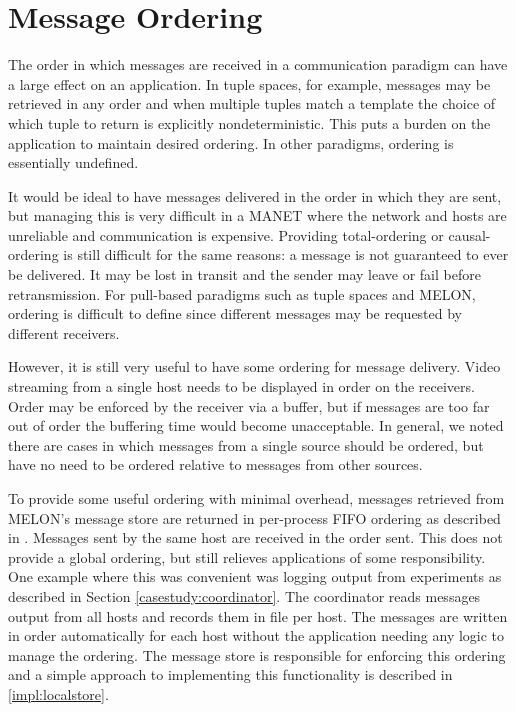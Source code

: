 \section{Message Ordering}

The order in which messages are received in a communication paradigm can have a large effect on an application. In tuple spaces, for example, messages may be retrieved in any order and when multiple tuples match a template the choice of which tuple to return is explicitly nondeterministic. This puts a burden on the application to maintain desired ordering. In other paradigms, ordering is essentially undefined. 

It would be ideal to have messages delivered in the order in which they are sent, but managing this is very difficult in a MANET where the network and hosts are unreliable and communication is expensive. Providing total-ordering or causal-ordering is still difficult for the same reasons: a message is not guaranteed to ever be delivered. It may be lost in transit and the sender may leave or fail before retransmission.  For pull-based paradigms such as tuple spaces and MELON, ordering is difficult to define since different messages may be requested by different receivers.

However, it is still very useful to have some ordering for message delivery. Video streaming from a single host needs to be displayed in order on the receivers. Order may be enforced by the receiver via a buffer, but if messages are too far out of order the buffering time would become unacceptable. In general, we noted there are cases in which messages from a single source should be ordered, but have no need to be ordered relative to messages from other sources.

To provide some useful ordering with minimal overhead, messages retrieved from MELON's message store are returned in per-process FIFO ordering as described in \cite{distbook}. Messages sent by the same host are received in the order sent. This does not provide a global ordering, but still relieves applications of some responsibility. One example where this was convenient was logging output from experiments as described in Section \ref{casestudy:coordinator}. The coordinator reads messages output from all hosts and records them in file per host. The messages are written in order automatically for each host without the application needing any logic to manage the ordering. The message store is responsible for enforcing this ordering and a simple approach to implementing this functionality is described in \ref{impl:localstore}.